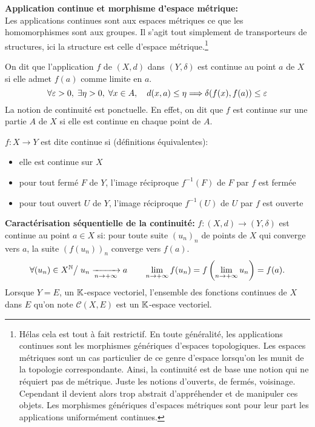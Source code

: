 \documentclass[12pt,a4paper]{article}
\begin{document}
	\textbf{Application continue et morphisme d'espace métrique:}\\
	Les applications continues sont aux espaces métriques ce que les homomorphismes sont aux groupes. Il s'agit tout simplement de transporteurs de structures, ici la structure est celle d'espace métrique.\footnote{Hélas cela est tout à fait restrictif. En toute généralité, les applications continues sont les morphismes génériques d'espaces topologiques. Les espaces métriques sont un cas particulier de ce genre d'espace lorsqu'on les munit de la topologie correspondante. Ainsi, la continuité est de base une notion qui ne réquiert pas de métrique. Juste les notions d'ouverts, de fermés, voisinage. Cependant il devient alors trop abstrait d'appréhender et de manipuler ces objets.
		Les morphismes génériques d'espaces métriques sont pour leur part les applications uniformément continues.}
	\par On dit que l'application $f$ de $(X,d)$ dans $(Y,\delta)$ est continue au point $a$ de $X$ si elle admet $f(a)$ comme limite en $a$.
	\[ \forall \varepsilon >0, \; \exists \eta >0, \; \forall x \in A , \quad d(x,a)\leq\eta \Longrightarrow \delta(f(x),f(a))\leq\varepsilon   \]
	La notion de continuité est ponctuelle. En effet, on dit que $f$ est continue sur une partie $A$ de $X$ si elle est continue en chaque point de $A$.
	\par$f:X\longrightarrow Y$ est dite continue si (définitions équivalentes): 
	\begin{itemize}
		\item elle est continue sur $X$
		\item pour tout fermé $F$ de $Y$, l'image réciproque $f^{-1}(F)$ de $F$ par $f$ est fermée
		\item pour tout ouvert $U$ de $Y$, l'image réciproque $f^{-1}(U)$ de $U$ par $f$ est ouverte
	\end{itemize}
	
	\textbf{Caractérisation séquentielle de la continuité:}  $f : (X,d) \longrightarrow (Y,\delta) $ est continue au point $a\in X$ si: 
	pour toute suite $(u_n)_n$ de points de $X$ qui converge vers $a$, la suite $(f(u_n))_n$ converge vers $f(a)$.
	\[ \forall (u_n)\in X^{\mathbb{N}} \big/\; u_n \xrightarrow[n\to +\infty]{} a\qquad \lim\limits_{n\to +\infty}f(u_n)=f\left(\lim\limits_{n\to +\infty}u_n\right)=f(a).  \]
	Lorsque $Y=E$, un $\mathbb{K}$-espace vectoriel, l'ensemble des fonctions continues de $X$ dans $E$ qu'on note $\mathcal{C}(X,E)$ est un $\mathbb{K}$-espace vectoriel.\\
	
\end{document}
